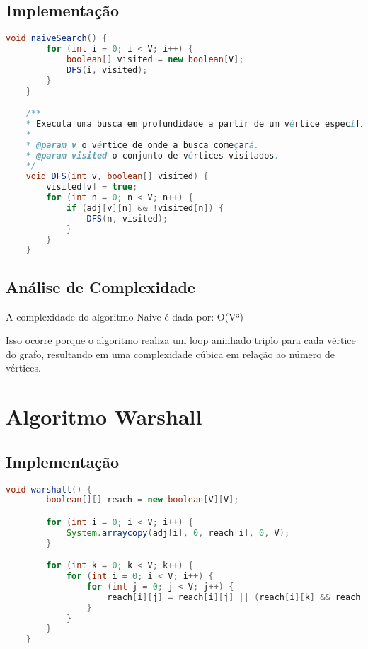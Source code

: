 \documentclass{article}
\begin{document}
\subsection{Implementação}


\begin{lstlisting}[language=Java, caption=Implementação do algoritmo Naive]
    void naiveSearch() {
        for (int i = 0; i < V; i++) {
            boolean[] visited = new boolean[V];
            DFS(i, visited);
        }
    }

    /**
    * Executa uma busca em profundidade a partir de um vértice específico.
    *
    * @param v o vértice de onde a busca começará.
    * @param visited o conjunto de vértices visitados.
    */
    void DFS(int v, boolean[] visited) {
        visited[v] = true;
        for (int n = 0; n < V; n++) {
            if (adj[v][n] && !visited[n]) {
                DFS(n, visited);
            }
        }
    }
\end{lstlisting}

\subsection{Análise de Complexidade}
\vspace{10pt} %
    A complexidade do algoritmo Naive é dada por: O(V³)
    \vspace{10pt} %
    
    \par Isso ocorre porque o algoritmo realiza um loop aninhado triplo para cada vértice do grafo, resultando em uma complexidade cúbica em relação ao número de vértices.

\section{Algoritmo Warshall}


\subsection{Implementação}


\begin{lstlisting}[language=Java, caption=Implementação do algoritmo Warshall]
    void warshall() {
        boolean[][] reach = new boolean[V][V];

        for (int i = 0; i < V; i++) {
            System.arraycopy(adj[i], 0, reach[i], 0, V);
        }

        for (int k = 0; k < V; k++) {
            for (int i = 0; i < V; i++) {
                for (int j = 0; j < V; j++) {
                    reach[i][j] = reach[i][j] || (reach[i][k] && reach[k][j]);
                }
            }
        }
    }
\end{lstlisting}
\end{document}
